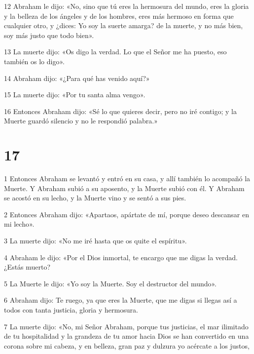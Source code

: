 \par 12 Abraham le dijo: «No, sino que tú eres la hermosura del mundo, eres la gloria y la belleza de los ángeles y de los hombres, eres más hermoso en forma que cualquier otro, y ¿dices: Yo soy la suerte amarga? de la muerte, y no más bien, soy más justo que todo bien».

\par 13 La muerte dijo: «Os digo la verdad. Lo que el Señor me ha puesto, eso también os lo digo».

\par 14 Abraham dijo: «¿Para qué has venido aquí?»

\par 15 La muerte dijo: «Por tu santa alma vengo».

\par 16 Entonces Abraham dijo: «Sé lo que quieres decir, pero no iré contigo; y la Muerte guardó silencio y no le respondió palabra.»

\chapter{17}

\par 1 Entonces Abraham se levantó y entró en su casa, y allí también lo acompañó la Muerte. Y Abraham subió a su aposento, y la Muerte subió con él. Y Abraham se acostó en su lecho, y la Muerte vino y se sentó a sus pies.

\par 2 Entonces Abraham dijo: «Apartaos, apártate de mí, porque deseo descansar en mi lecho».

\par 3 La muerte dijo: «No me iré hasta que os quite el espíritu».

\par 4 Abraham le dijo: «Por el Dios inmortal, te encargo que me digas la verdad. ¿Estás muerto?

\par 5 La Muerte le dijo: «Yo soy la Muerte. Soy el destructor del mundo».

\par 6 Abraham dijo: Te ruego, ya que eres la Muerte, que me digas si llegas así a todos con tanta justicia, gloria y hermosura.

\par 7 La muerte dijo: «No, mi Señor Abraham, porque tus justicias, el mar ilimitado de tu hospitalidad y la grandeza de tu amor hacia Dios se han convertido en una corona sobre mi cabeza, y en belleza, gran paz y dulzura yo acércate a los justos,

